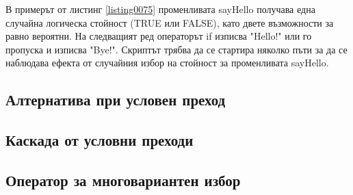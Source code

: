 В примерът от листинг \ref{listing0075} променливата sayHello получава една случайна логическа стойност (TRUE или FALSE), като двете възможности за равно вероятни. На следващият ред операторът if изписва "Hello!" или го пропуска и изписва "Bye!". Скриптът трябва да се стартира няколко пъти за да се наблюдава ефекта от случайния избор на стойност за променливата sayHello.

\subsection{Алтернатива при условен преход}

\subsection{Каскада от условни преходи}

\subsection{Оператор за многовариантен избор}

